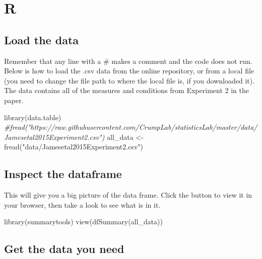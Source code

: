 \documentclass[
]{book}
\newenvironment{Shaded}{\begin{snugshade}}{\end{snugshade}}
\newcommand{\CommentTok}[1]{\textcolor[rgb]{0.56,0.35,0.01}{\textit{#1}}}
\newcommand{\FunctionTok}[1]{\textcolor[rgb]{0.00,0.00,0.00}{#1}}
\newcommand{\NormalTok}[1]{#1}
\newcommand{\OtherTok}[1]{\textcolor[rgb]{0.56,0.35,0.01}{#1}}
\newcommand{\StringTok}[1]{\textcolor[rgb]{0.31,0.60,0.02}{#1}}
\begin{document}
\hypertarget{r-8}{%
\section{R}\label{r-8}}

\hypertarget{load-the-data-2}{%
\subsection{Load the data}\label{load-the-data-2}}

Remember that any line with a \# makes a comment and the code does not run. Below is how to load the .csv data from the online repository, or from a local file (you need to change the file path to where the local file is, if you downloaded it). The data contains all of the measures and conditions from Experiment 2 in the paper.

\begin{Shaded}
\begin{Highlighting}[]
\FunctionTok{library}\NormalTok{(data.table)}
\CommentTok{\#fread("https://raw.githubusercontent.com/CrumpLab/statisticsLab/master/data/Jamesetal2015Experiment2.csv")}
\NormalTok{all\_data }\OtherTok{\textless{}{-}} \FunctionTok{fread}\NormalTok{(}\StringTok{"data/Jamesetal2015Experiment2.csv"}\NormalTok{)}
\end{Highlighting}
\end{Shaded}

\hypertarget{inspect-the-dataframe}{%
\subsection{Inspect the dataframe}\label{inspect-the-dataframe}}

This will give you a big picture of the data frame. Click the button to view it in your browser, then take a look to see what is in it.

\begin{Shaded}
\begin{Highlighting}[]
\FunctionTok{library}\NormalTok{(summarytools)}
\FunctionTok{view}\NormalTok{(}\FunctionTok{dfSummary}\NormalTok{(all\_data))}
\end{Highlighting}
\end{Shaded}

\hypertarget{get-the-data-you-need}{%
\subsection{Get the data you need}\label{get-the-data-you-need}}
\end{document}
